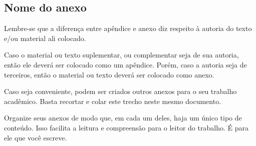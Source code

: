 
\begin{anexosenv}
    \partanexos


    \chapter{Nome do anexo}
    \label{chap_anexo_a}

    Lembre-se que a diferença entre apêndice e anexo diz respeito à autoria do texto e/ou material ali colocado.

    Caso o material ou texto suplementar, ou complementar seja de sua autoria, então ele deverá ser colocado como um apêndice.
    Porém, caso a autoria seja de terceiros, então o material ou texto deverá ser colocado como anexo.

    Caso seja conveniente, podem ser criados outros anexos para o seu trabalho acadêmico.
    Basta recortar e colar este trecho neste mesmo documento.

    Organize seus anexos de modo que, em cada um deles, haja um único tipo de conteúdo.
    Isso facilita a leitura e compreensão para o leitor do trabalho.
    É para ele que você escreve.

\end{anexosenv}
